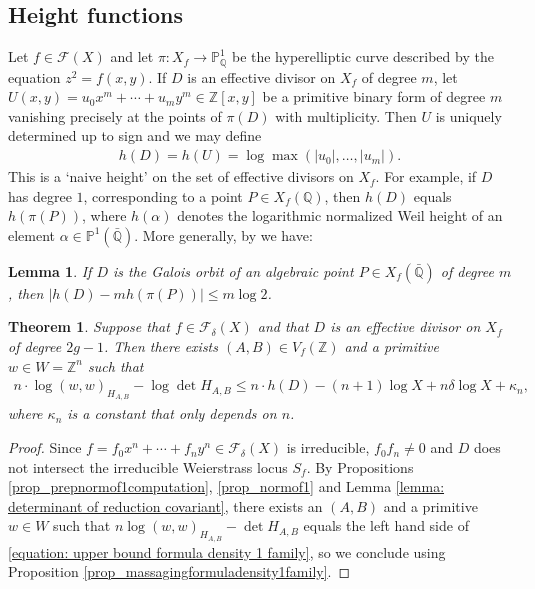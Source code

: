 \documentclass{article} %
\newtheorem{theorem}[proposition]{Theorem}
\newtheorem{lemma}[proposition]{Lemma}
\numberwithin{equation}{section}
\renewcommand{\P}{\mathbb{P}}
\newcommand{\Q}{\mathbb{Q}}
\newcommand{\Z}{\mathbb{Z}}
\begin{document}
\subsection{Height functions}

Let $f\in \mathcal{F}(X)$ and let $\pi\colon X_f\rightarrow \P^1_{\Q}$ be the hyperelliptic curve described by the equation $z^2 = f(x,y)$. 
If $D$ is an effective divisor on $X_f$ of degree $m$, let $U(x,y) = u_0 x^m + \cdots +u_m y^m\in \Z[x,y]$ be a primitive binary form of degree $m$ vanishing precisely at the points of $\pi(D)$ with multiplicity. 
Then $U$ is uniquely determined up to sign and we may define
\begin{align*}
    h(D) =h(U) =  \log \max(|u_0|, \dots,|u_m|). 
\end{align*}
This is a `naive height' on the set of effective divisors on $X_f$.
For example, if $D$ has degree $1$, corresponding to a point $P\in X_f(\Q)$, then $h(D)$ equals $h(\pi(P))$, where $h(\alpha)$ denotes the logarithmic normalized Weil height of an element $\alpha \in \P^1(\bar{\Q})$.
More generally, by \cite[Theorem VIII.5.9]{Silverman-arithmeticellcurvesbook} we have:
\begin{lemma}\label{lemma_heightalgebraicpointminpoly}
    If $D$ is the Galois orbit of an algebraic point $P\in X_f(\bar{\Q})$ of degree $m$, then $|h(D) - m h(\pi(P)) | \leq m \log 2$.
\end{lemma}

\begin{theorem}\label{theorem_upperboundvectorlengthusingheight}
    Suppose that $f \in \mathcal{F}_{\delta}(X)$ and that $D$ is an effective divisor on $X_f$ of degree $2g-1$.
    Then there exists $(A,B)\in V_f(\Z)$ and a primitive $w\in W=\Z^n$ such that 
    \begin{align*}
        n\cdot \log(w,w)_{H_{A,B}} - \log \det H_{A,B} \leq n\cdot h(D) - (n+1)\log X + n\delta \log X + \kappa_{n},
    \end{align*}
    where $\kappa_n$ is a constant that only depends on $n$.
\end{theorem}
\begin{proof}
    Since $f = f_0 x^n + \cdots + f_n y^n \in \mathcal{F}_{\delta}(X)$ is irreducible, $f_0f_n \neq 0$ and $D$ does not intersect the irreducible Weierstrass locus $S_f$.
    By Propositions \ref{prop_prepnormof1computation}, \ref{prop_normof1} and Lemma \ref{lemma: determinant of reduction covariant}, there exists an $(A,B)$ and a primitive $w\in W$ such that $n\log (w,w)_{H_{A,B}} - \det H_{A,B}$ equals the left hand side of \eqref{equation: upper bound formula density 1 family}, so we conclude using Proposition \ref{prop_massagingformuladensity1family}.
\end{proof}
\end{document}
